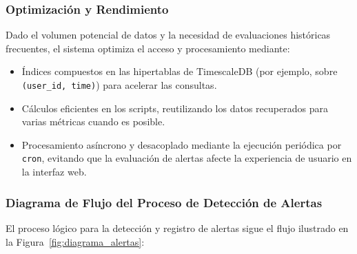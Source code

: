\subsubsection{Optimización y Rendimiento}
Dado el volumen potencial de datos y la necesidad de evaluaciones históricas frecuentes, el sistema optimiza el acceso y procesamiento mediante:
\begin{itemize}
    \item Índices compuestos en las hipertablas de TimescaleDB (por ejemplo, sobre \texttt{(user\_id, time)}) para acelerar las consultas.
    \item Cálculos eficientes en los scripts, reutilizando los datos recuperados para varias métricas cuando es posible.
    \item Procesamiento asíncrono y desacoplado mediante la ejecución periódica por \texttt{cron}, evitando que la evaluación de alertas afecte la experiencia de usuario en la interfaz web.
\end{itemize}

\subsubsection{Diagrama de Flujo del Proceso de Detección de Alertas}
El proceso lógico para la detección y registro de alertas sigue el flujo ilustrado en la Figura~\ref{fig:diagrama_alertas}:

